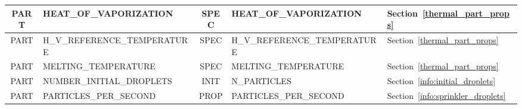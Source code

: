 \documentclass[11pt]{book}
\begin{document}
\begin{table}
\begin{tabular}{@{\extracolsep{\fill}}|c|l|c|l|l|}
{\ct PART}    & {\ct HEAT\_OF\_VAPORIZATION}        &  {\ct SPEC}  &  {\ct HEAT\_OF\_VAPORIZATION}               & Section~\ref{thermal_part_props}         \\ \hline
{\ct PART}    & {\ct H\_V\_REFERENCE\_TEMPERATURE}  &  {\ct SPEC}  &   {\ct H\_V\_REFERENCE\_TEMPERATURE}        & Section~\ref{thermal_part_props}         \\ \hline
{\ct PART}    & {\ct MELTING\_TEMPERATURE}          &  {\ct SPEC}  & {\ct MELTING\_TEMPERATURE}                  & Section~\ref{thermal_part_props}         \\ \hline
{\ct PART}    & {\ct NUMBER\_INITIAL\_DROPLETS}     &  {\ct INIT}  & {\ct N\_PARTICLES}                          & Section~\ref{info:initial_droplets}      \\ \hline
{\ct PART}    & {\ct PARTICLES\_PER\_SECOND}        &  {\ct PROP}  & {\ct PARTICLES\_PER\_SECOND}                & Section~\ref{info:sprinkler_droplets}    \\ \hline
\end{tabular}
\end{table}
\end{document}
